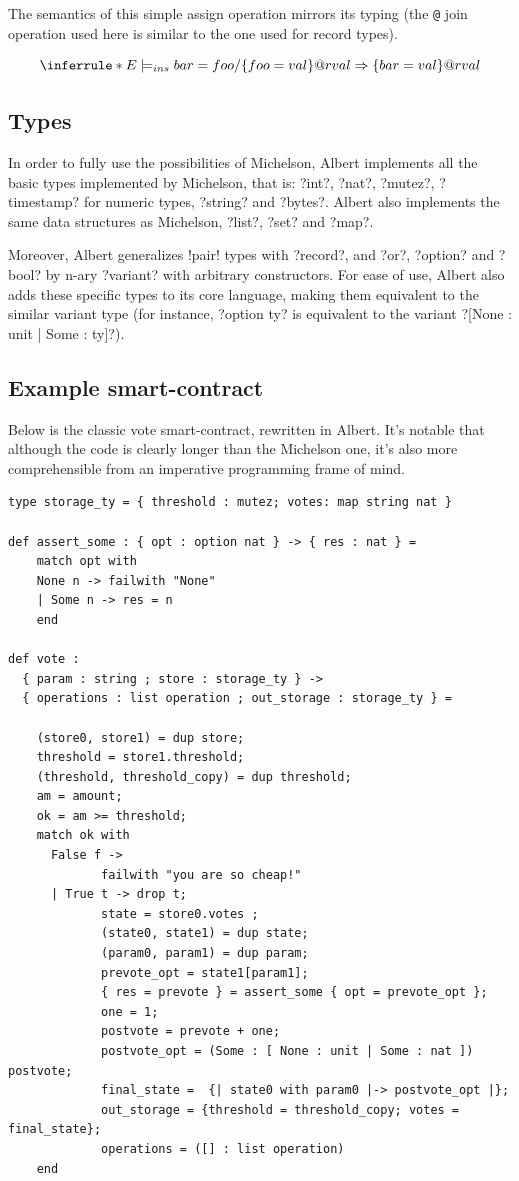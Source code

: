 \documentclass{report}
\begin{document}
The semantics of this simple assign operation mirrors its typing (the \texttt{@} join operation used here is similar to the one used for record types).

$$
\inferrule*
    { }
    { E \models_{ins} bar = foo / \{ foo = val \} @ rval \Rightarrow \{ bar = val \} @ rval }
    $$

\subsection{Types}

In order to fully use the possibilities of Michelson, Albert implements all the basic types implemented by Michelson, that is: ?int?, ?nat?, ?mutez?, ?timestamp? for numeric types, ?string? and ?bytes?. Albert also implements the same data structures as Michelson, ?list?, ?set? and ?map?.

Moreover, Albert generalizes !pair! types with ?record?, and ?or?, ?option? and ?bool? by n-ary ?variant? with arbitrary constructors. For ease of use, Albert also adds these specific types to its core language, making them equivalent to the similar variant type (for instance, ?option ty? is equivalent to the variant ?[None : unit | Some : ty]?).

\subsection{Example smart-contract}

Below is the classic vote smart-contract, rewritten in Albert. It's notable that although the code is clearly longer than the Michelson one, it's also more comprehensible from an imperative programming frame of mind.

\lstset{language=albert,numbers=left}
\begin{lstlisting}
type storage_ty = { threshold : mutez; votes: map string nat }

def assert_some : { opt : option nat } -> { res : nat } =
    match opt with
    None n -> failwith "None"
    | Some n -> res = n
    end

def vote :
  { param : string ; store : storage_ty } ->
  { operations : list operation ; out_storage : storage_ty } =

    (store0, store1) = dup store;
    threshold = store1.threshold;
    (threshold, threshold_copy) = dup threshold;
    am = amount;
    ok = am >= threshold;
    match ok with
      False f ->
             failwith "you are so cheap!"
      | True t -> drop t;
             state = store0.votes ;
             (state0, state1) = dup state;
             (param0, param1) = dup param;
             prevote_opt = state1[param1];
             { res = prevote } = assert_some { opt = prevote_opt };
             one = 1;
             postvote = prevote + one;
             postvote_opt = (Some : [ None : unit | Some : nat ]) postvote;
             final_state =  {| state0 with param0 |-> postvote_opt |};
             out_storage = {threshold = threshold_copy; votes = final_state};
             operations = ([] : list operation)
    end
\end{lstlisting}
\end{document}
